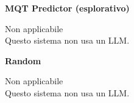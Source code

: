 \par\vspace{0.25cm}\begin{minipage}[t]{0.49\linewidth}\centering
{\color{black}\normalsize\bfseries MQT Predictor (esplorativo)}\par\smallskip
\parbox[c][5.2cm][c]{\linewidth}{\centering\large Non applicabile\\[5pt]\normalsize Questo sistema non usa un LLM.}
\end{minipage}
\hfill\begin{minipage}[t]{0.49\linewidth}\centering
{\color{black}\normalsize\bfseries Random}\par\smallskip
\parbox[c][5.2cm][c]{\linewidth}{\centering\large Non applicabile\\[5pt]\normalsize Questo sistema non usa un LLM.}
\end{minipage}
